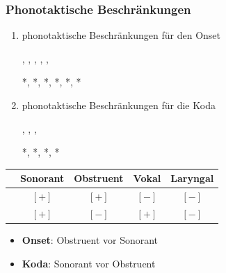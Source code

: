 \begin{frame}
\frametitle{Phonotaktische Beschränkungen}

\begin{enumerate}
	\item phonotaktische Beschränkungen für den Onset
	
          \ea
          , , ,
          , , 
          \z

          \ea
          *, *, *, *, *, *
          \z

	\item phonotaktische Beschränkungen für die Koda

          \ea
          , , , 
          \z

          \ea
          *, *, *, *
          \z

\end{enumerate}
	

\begin{table}
\centering
\begin{tabular}{c|c|c|c|c} 
 & Sonorant & Obstruent & Vokal & Laryngal \\ 
\hline 
[kon] & $[+]$ & $[+]$ & $[-]$ & $[-]$ \\ 
\hline 
[son] & $[+]$ & $[-]$ & $[+]$ & $[-]$
\end{tabular} 

\end{table}

\begin{itemize}
	\item \textbf{Onset}: Obstruent vor Sonorant
	\item \textbf{Koda}: Sonorant vor Obstruent
\end{itemize}

\end{frame}



